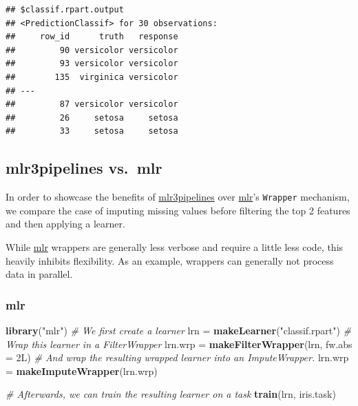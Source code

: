 \documentclass[]{scrbook}
\newenvironment{Shaded}{\begin{snugshade}}{\end{snugshade}}
\newcommand{\CommentTok}[1]{\textcolor[rgb]{0.56,0.35,0.01}{\textit{#1}}}
\newcommand{\DataTypeTok}[1]{\textcolor[rgb]{0.13,0.29,0.53}{#1}}
\newcommand{\KeywordTok}[1]{\textcolor[rgb]{0.13,0.29,0.53}{\textbf{#1}}}
\newcommand{\NormalTok}[1]{#1}
\newcommand{\OperatorTok}[1]{\textcolor[rgb]{0.81,0.36,0.00}{\textbf{#1}}}
\newcommand{\StringTok}[1]{\textcolor[rgb]{0.31,0.60,0.02}{#1}}
\renewenvironment{Shaded} {\begin{snugshade}\small} {\end{snugshade}}
\begin{document}
\begin{Shaded}
\end{Shaded}

\begin{verbatim}
## $classif.rpart.output
## <PredictionClassif> for 30 observations:
##     row_id      truth   response
##         90 versicolor versicolor
##         93 versicolor versicolor
##        135  virginica versicolor
## ---                             
##         87 versicolor versicolor
##         26     setosa     setosa
##         33     setosa     setosa
\end{verbatim}

\hypertarget{mlr3pipelines-vs.mlr}{%
\subsection{mlr3pipelines vs.~mlr}\label{mlr3pipelines-vs.mlr}}

In order to showcase the benefits of \href{https://cran.r-project.org/package=mlr3pipelines}{mlr3pipelines} over \href{https://cran.r-project.org/package=mlr}{mlr}'s \texttt{Wrapper} mechanism, we compare the case of imputing missing values before filtering the top 2 features and then applying a learner.

While \href{https://cran.r-project.org/package=mlr}{mlr} wrappers are generally less verbose and require a little less code, this heavily inhibits flexibility.
As an example, wrappers can generally not process data in parallel.

\hypertarget{mlr}{%
\subsubsection{mlr}\label{mlr}}

\begin{Shaded}
\begin{Highlighting}[]
\KeywordTok{library}\NormalTok{(}\StringTok{"mlr"}\NormalTok{)}
\CommentTok{# We first create a learner}
\NormalTok{lrn =}\StringTok{ }\KeywordTok{makeLearner}\NormalTok{(}\StringTok{"classif.rpart"}\NormalTok{)}
\CommentTok{# Wrap this learner in a FilterWrapper}
\NormalTok{lrn.wrp =}\StringTok{ }\KeywordTok{makeFilterWrapper}\NormalTok{(lrn, }\DataTypeTok{fw.abs =}\NormalTok{ 2L)}
\CommentTok{# And wrap the resulting wrapped learner into an ImputeWrapper.}
\NormalTok{lrn.wrp =}\StringTok{ }\KeywordTok{makeImputeWrapper}\NormalTok{(lrn.wrp)}

\CommentTok{# Afterwards, we can train the resulting learner on a task}
\KeywordTok{train}\NormalTok{(lrn, iris.task)}
\end{Highlighting}
\end{Shaded}
\end{document}
